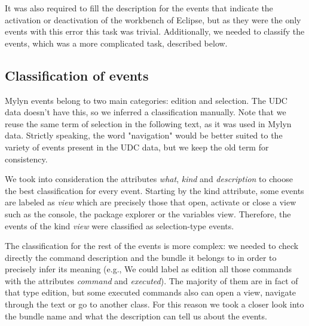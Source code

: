 \documentclass[times]{smrauth}
\begin{document}
It was also required to fill the description for the events that indicate the activation or deactivation of the workbench of Eclipse, but as they were the only events with this error this task was trivial. Additionally, we needed to classify the events, which was a more complicated task, described below.


\subsection{Classification of events}
Mylyn events belong to two main categories: edition and selection. The UDC data doesn't have this, so we inferred a classification manually. Note that we reuse the same term of selection in the following text, as it was used in Mylyn data. Strictly speaking, the word "navigation" would be better suited to the variety of events present in the UDC data, but we keep the old term for consistency.

We took into consideration the attributes \textit{what}, \textit{kind} and \textit{description} to choose the best classification for every event. Starting by the kind attribute, some events are labeled as \textit{view} which are precisely those that open, activate or close a view such as the console, the package explorer or the variables view. Therefore, the events of the kind \textit{view} were classified as selection-type events.

The classification for the rest of the events is more complex: we needed to check directly the command description and the bundle it belongs to in order to precisely infer its meaning (e.g., We could label as edition all those commands with the attributes \textit{command} and \textit{executed}). The majority of them are in fact of that type edition, but some executed commands also can open a view, navigate through the text or go to another class. For this reason we took a closer look into the bundle name and what the description can tell us about the events.
\end{document}
